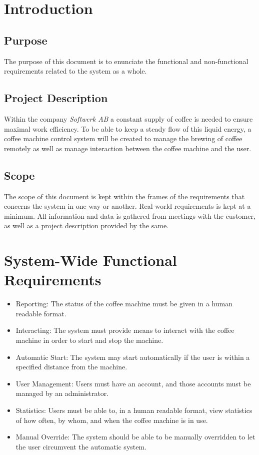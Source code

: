 \section{Introduction}

\subsection{Purpose}

The purpose of this document is to enunciate the functional and non-functional
requirements related to the system as a whole.


\subsection{Project Description}

Within the company \textit{Softwerk AB} a constant supply of coffee is needed to ensure maximal work efficiency. To be able to keep a steady flow of this liquid energy, a coffee machine control system will be created to manage the brewing of coffee remotely as well as manage interaction between the coffee machine and the user.


\subsection{Scope}

The scope of this document is kept within the frames of the requirements that concerns the system in one way or another. Real-world requirements is kept at a minimum. All information and data is gathered from meetings with the customer, as well as a project description provided by the same.

\section{System-Wide Functional Requirements}

\begin{itemize}
\item Reporting: The status of the coffee machine must be given in a
human readable format.
\item Interacting: The system must provide means to interact with the
coffee machine in order to start and stop the machine.
\item Automatic Start: The system may start automatically if the user is
within a specified distance from the machine.
\item User Management: Users must have an account, and those accounts
must be managed by an administrator.
\item Statistics: Users must be able to, in a human readable format, view statistics of how often, by whom, and when the coffee machine is in use.
\item Manual Override: The system should be able to be manually overridden
to let the user circumvent the automatic system.
\end{itemize}

